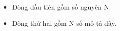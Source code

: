 \begin{itemize}
	\item     Dòng đầu tiên gồm số nguyên N.   
	\item     Dòng thứ hai gồm N số mô tả dãy.   
\end{itemize}

\